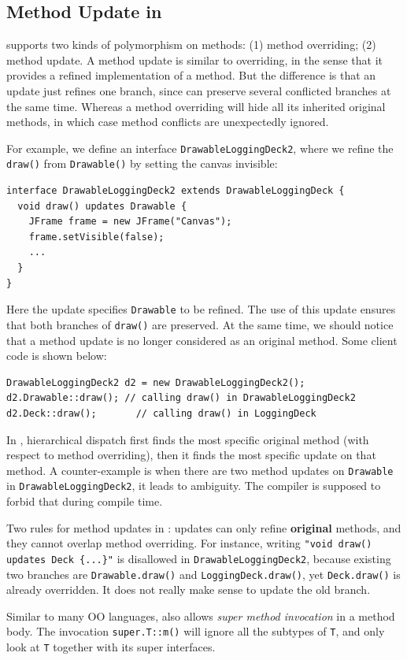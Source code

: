 \subsection{Method Update in \MIM	}

\MIM{} supports two kinds of polymorphism on methods: (1) method overriding; (2) method update. A method update is similar to overriding, in the sense that it provides a refined implementation of a method. But the difference is that an update just refines one branch, since \MIM{} can preserve several conflicted branches at the same time. Whereas a method overriding will hide all its inherited original methods, in which case method conflicts are unexpectedly ignored.

For example, we define an interface \lstinline|DrawableLoggingDeck2|, where we refine the \lstinline|draw()| from \lstinline|Drawable()| by setting
the canvas invisible:
\vspace{3pt}\begin{lstlisting}
interface DrawableLoggingDeck2 extends DrawableLoggingDeck {
  void draw() updates Drawable {
    JFrame frame = new JFrame("Canvas");
    frame.setVisible(false);
    ...
  }
}
\end{lstlisting}\vspace{3pt}
Here the update specifies \lstinline|Drawable| to be refined. The use of this update ensures that both branches of \lstinline|draw()| are preserved. At the same time, we should notice that a method update is no longer considered as an original method. Some client code is shown below:
\vspace{3pt}\begin{lstlisting}
DrawableLoggingDeck2 d2 = new DrawableLoggingDeck2();
d2.Drawable::draw(); // calling draw() in DrawableLoggingDeck2
d2.Deck::draw();       // calling draw() in LoggingDeck
\end{lstlisting}\vspace{3pt}

In \MIM{}, hierarchical dispatch first finds the most specific original method (with respect to method overriding), then it finds the most specific update on that method. A counter-example is when there are two method updates on \lstinline|Drawable| in \lstinline|DrawableLoggingDeck2|, it leads to ambiguity. The compiler is supposed to forbid that during compile time.

Two rules for method updates in \MIM: updates can only refine \textbf{original} methods, and they cannot overlap method overriding. For instance, writing \lstinline|"void draw()| \lstinline|updates Deck {...}"| is disallowed in \lstinline|DrawableLoggingDeck2|, because existing two branches are \lstinline|Drawable.draw()| and \lstinline|LoggingDeck.draw()|, yet \lstinline|Deck.draw()| is already overridden. It does not really make sense to update the old branch.

Similar to many OO languages, \MIM{} also allows \textit{super method invocation} in a method body. The invocation \lstinline|super.T::m()| will ignore all the subtypes of \lstinline|T|, and only look at \lstinline|T| together with its super interfaces.